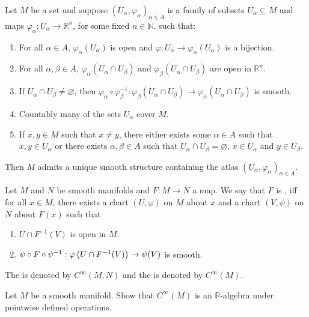 \begin{proposition}
	Let $M$ be a set and suppose $(U_\alpha,\varphi_\alpha)_{\alpha \in A}$ is a family of subsets $U_\alpha \subseteq M$ and maps $\varphi_\alpha : U_\alpha \to \mathbb{R}^n$, for some fixed $n \in \mathbb{N}$, such that:
	\begin{enumerate}[label = \textup{(\roman*)},leftmargin=*]
		\item For all $\alpha \in A$, $\varphi_\alpha(U_\alpha)$ is open and $\varphi : U_\alpha \to \varphi_\alpha(U_\alpha)$ is a bijection.
		\item For all $\alpha,\beta \in A$, $\varphi_\alpha(U_\alpha \cap U_\beta)$ and $\varphi_\beta(U_\alpha \cap U_\beta)$ are open in $\mathbb{R}^n$.
		\item If $U_\alpha \cap U_\beta \neq \varnothing$, then $\varphi_\alpha \circ \varphi_\beta^{-1} : \varphi_\beta(U_\alpha \cap U_\beta) \to \varphi_\alpha(U_\alpha \cap U_\beta)$ is smooth.
		\item Countably many of the sets $U_\alpha$ cover $M$.
		\item If $x,y \in M$ such that $x \neq y$, there either exists some $\alpha \in A$ such that $x,y \in U_\alpha$ or there exists $\alpha,\beta \in A$ such that $U_\alpha \cap U_\beta = \varnothing$, $x \in U_\alpha$ and $y \in U_\beta$.
	\end{enumerate}
	Then $M$ admits a unique smooth structure containing the atlas $(U_\alpha,\varphi_\alpha)_{\alpha \in A}$.
\end{proposition}

\begin{definition}
	Let $M$ and $N$ be smooth manifolds and $F : M \to N$ a map. We say that $F$ is , iff for all $x \in M$, there exists a chart $(U,\varphi)$ on $M$ about $x$ and a chart $(V,\psi)$ on $N$ about $F(x)$ such that
	\begin{enumerate}[label = \textup{(\roman*)},leftmargin=*]
		\item $U \cap F^{-1}(V)$ is open in $M$.
		\item $\psi \circ F \circ \psi^{-1} : \varphi\del[1]{U \cap F^{-1}(V)} \to \psi(V)$ is smooth.
	\end{enumerate}
	The  is denoted by $C^\infty(M,N)$ and the  is denoted by $C^\infty(M)$.
\end{definition}

\begin{exercise}
	Let $M$ be a smooth manifold. Show that $C^\infty(M)$ is an $\mathbb{R}$-algebra under pointwise defined operations.
\end{exercise}

